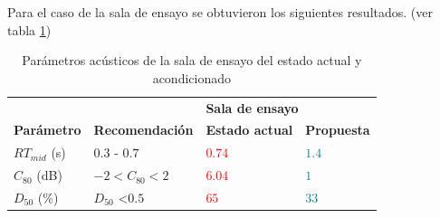 Para el caso de la sala de ensayo se obtuvieron los siguientes resultados. (ver tabla \ref{tab: resultados sala de ensayo})
\begin{table}[H]
    \centering
    \begin{tabular}{|l|l|ll|}
    \hline
     &  & \multicolumn{2}{l|}{\textbf{Sala de ensayo}} \\ \cline{3-4} 
    \multirow{-2}{*}{\textbf{Parámetro}} & \multirow{-2}{*}{\textbf{Recomendación}} & \multicolumn{1}{l|}{\textbf{Estado actual}} & \textbf{Propuesta} \\ \hline
    $RT_{mid}$ (s) & $0.3$ - $0.7$ & \multicolumn{1}{l|}{\textcolor{red}{$0.74$}} & \textcolor{teal}{$1.4$} \\ \hline
    $C_{80}$ (dB) & $-2<C_{80}<2$ & \multicolumn{1}{l|}{\textcolor{red}{$6.04$}} & \textcolor{teal}{$1$} \\ \hline
    $D_{50}$ ($\%$) & $D_{50}$ \textless $0.5$ & \multicolumn{1}{l|}{\textcolor{red}{$65$}} & \textcolor{teal}{$33$} \\ \hline
    \end{tabular}
    \caption{Parámetros acústicos de la sala de ensayo del estado actual y acondicionado}
    \label{tab: resultados sala de ensayo}
\end{table}